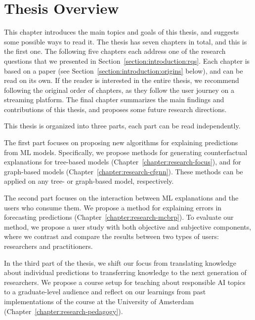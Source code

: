 
\section{Thesis Overview}
\label{section:introduction:overview}



This chapter introduces the main topics and goals of this thesis, and suggests some possible ways to read it. The thesis has seven chapters in total, and this is the first one. The following five chapters each address one of the research questions that we presented in Section~\ref{section:introduction:rqs}. Each chapter is based on a paper (see Section~\ref{section:introduction:origins} below), and can be read on its own. If the reader is interested in the entire thesis, we recommend following the original order of chapters, as they follow the user journey on a streaming platform. The final chapter summarizes the main findings and contributions of this thesis, and proposes some future research directions.


\if
This thesis is organized into three parts, each part can be read independently. 

The first part focuses on proposing new algorithms for explaining predictions from ML models. 
Specifically, we propose methods for generating counterfactual explanations for tree-based models (Chapter~\ref{chapter:research-focus}), and for graph-based models (Chapter~\ref{chapter:research-cfgnn}). 
These methods can be applied on any tree- or graph-based model, respectively.

The second part focuses on the interaction between ML explanations and the users who consume them. 
We propose a method for explaining errors in forecasting predictions (Chapter~\ref{chapter:research-mcbrp}). 
To evaluate our method, we propose a user study with both objective and subjective components, where we contrast and compare the results between two types of users: researchers and practitioners. 


In the third part of the thesis, we shift our focus from translating knowledge about individual predictions to transferring knowledge to the next generation of researchers. 
We propose a course setup for teaching about responsible AI topics to a graduate-level audience and reflect on our learnings from past implementations of the course at the University of Amsterdam (Chapter~\ref{chapter:research-pedagogy}). 
\fi


